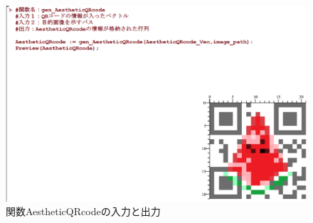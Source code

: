 \documentclass{thesis}
\begin{document}
\begin{figure}[H]
     \centering
     \includegraphics[width=1\linewidth]{pic/AestheticQRcode.eps}
     \caption{関数AestheticQRcodeの入力と出力}
     \label{AestheticQRcode_function}
\end{figure}







\end{document}
